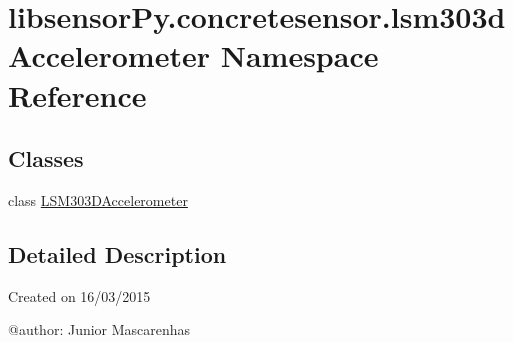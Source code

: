 \hypertarget{namespacelibsensorPy_1_1concretesensor_1_1lsm303dAccelerometer}{}\section{libsensor\+Py.\+concretesensor.\+lsm303d\+Accelerometer Namespace Reference}
\label{namespacelibsensorPy_1_1concretesensor_1_1lsm303dAccelerometer}
\subsection*{Classes}
\begin{DoxyCompactItemize}
\item 
class \hyperlink{classlibsensorPy_1_1concretesensor_1_1lsm303dAccelerometer_1_1LSM303DAccelerometer}{L\+S\+M303\+D\+Accelerometer}
\end{DoxyCompactItemize}


\subsection{Detailed Description}
\begin{DoxyVerb}Created on 16/03/2015

@author: Junior Mascarenhas
\end{DoxyVerb}
 